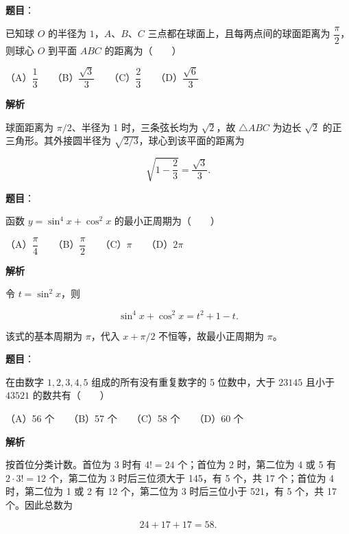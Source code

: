 \begin{answer}

\textbf{题目}：

已知球 $O$ 的半径为 $1$，$A\text{、}B\text{、}C$ 三点都在球面上，且每两点间的球面距离为 $\dfrac\pi2$，则球心 $O$ 到平面 $ABC$ 的距离为\mbox{（　　）}

（A）$\dfrac13$　　（B）$\dfrac{\sqrt3}{3}$　　（C）$\dfrac23$　　（D）$\dfrac{\sqrt6}{3}$

\textbf{解析}

球面距离为 $\pi/2$、半径为 1 时，三条弦长均为 $\sqrt2$，故 $\triangle ABC$ 为边长 $\sqrt2$ 的正三角形。其外接圆半径为 $\sqrt{2/3}$，球心到该平面的距离为

\nopagebreak[4]
\[
\sqrt{1-\frac23}=\frac{\sqrt3}{3}.
\]


\end{answer}
\begin{answer}

\textbf{题目}：

函数 $y=\sin^4x+\cos^2x$ 的最小正周期为\mbox{（　　）}

（A）$\dfrac\pi4$　　（B）$\dfrac\pi2$　　（C）$\pi$　　（D）$2\pi$

\textbf{解析}

令 $t=\sin^2x$，则

\nopagebreak[4]
\[
\sin^4x+\cos^2x=t^2+1-t.
\]

该式的基本周期为 $\pi$，代入 $x+\pi/2$ 不恒等，故最小正周期为 $\pi$。


\end{answer}
\begin{answer}

\textbf{题目}：

在由数字 $1,2,3,4,5$ 组成的所有没有重复数字的 5 位数中，大于 $23145$ 且小于 $43521$ 的数共有\mbox{（　　）}

（A）56 个　　（B）57 个　　（C）58 个　　（D）60 个

\textbf{解析}

按首位分类计数。首位为 3 时有 $4!=24$ 个；首位为 2 时，第二位为 4 或 5 有 $2\cdot3!=12$ 个，第二位为 3 时后三位须大于 145，有 5 个，共 17 个；首位为 4 时，第二位为 1 或 2 有 12 个，第二位为 3 时后三位小于 521，有 5 个，共 17 个。因此总数为

\nopagebreak[4]
\[
24+17+17=58.
\]


\end{answer}
